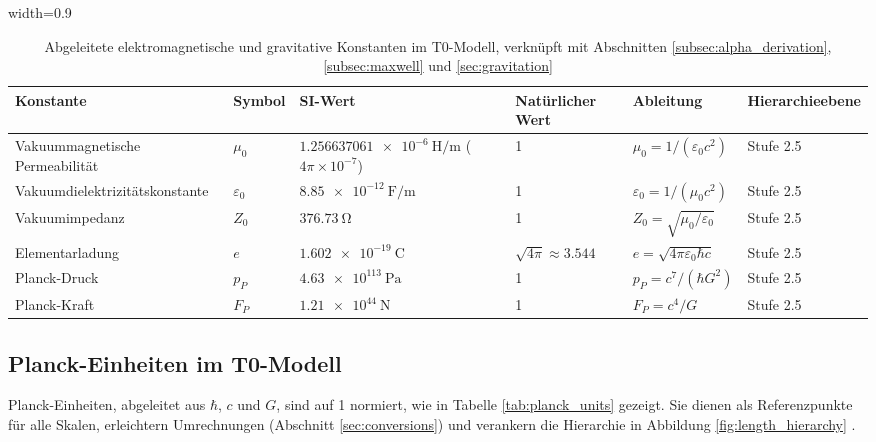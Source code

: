 \documentclass[12pt,a4paper]{article}
\newcommand{\tablescale}{0.9}
\begin{document}
	\begin{table}[htbp]
		\centering
		\begin{adjustbox}{width=\tablescale\textwidth}
			\begin{tabular}{llllll}
				\toprule
				\textbf{Konstante} & \textbf{Symbol} & \textbf{SI-Wert} & \textbf{Natürlicher Wert} & \textbf{Ableitung} & \textbf{Hierarchieebene} \\
				\midrule
				Vakuummagnetische Permeabilität & \(\mu_0\) & \(\SI{1.256637061e-6}{\henry\per\meter}\) (\(4\pi \times 10^{-7}\)) & 1 & \(\mu_0 = 1/(\varepsilon_0 c^2)\) & Stufe 2.5 \\
				Vakuumdielektrizitätskonstante & \(\varepsilon_0\) & \(\SI{8.85e-12}{\farad\per\meter}\) & 1 & \(\varepsilon_0 = 1/(\mu_0 c^2)\) & Stufe 2.5 \\
				Vakuumimpedanz & \(Z_0\) & \(\SI{376.73}{\ohm}\) & 1 & \(Z_0 = \sqrt{\mu_0/\varepsilon_0}\) & Stufe 2.5 \\
				Elementarladung & \(e\) & \(\SI{1.602e-19}{\coulomb}\) & \(\sqrt{4\pi} \approx 3.544\) & \(e = \sqrt{4\pi \varepsilon_0 \hbar c}\) & Stufe 2.5 \\
				Planck-Druck & \(p_P\) & \(\SI{4.63e113}{\pascal}\) & 1 & \(p_P = c^7/(\hbar G^2)\) & Stufe 2.5 \\
				Planck-Kraft & \(F_P\) & \(\SI{1.21e44}{\newton}\) & 1 & \(F_P = c^4/G\) & Stufe 2.5 \\
				\bottomrule
			\end{tabular}
		\end{adjustbox}
		\caption{Abgeleitete elektromagnetische und gravitative Konstanten im T0-Modell, verknüpft mit Abschnitten \ref{subsec:alpha_derivation}, \ref{subsec:maxwell} und \ref{sec:gravitation}}
		\label{tab:em_const}
	\end{table}
	
	\subsection{Planck-Einheiten im T0-Modell}
	\label{subsec:planck_units}
	
	Planck-Einheiten, abgeleitet aus \(\hbar\), \(c\) und \(G\), sind auf 1 normiert, wie in Tabelle \ref{tab:planck_units} gezeigt. Sie dienen als Referenzpunkte für alle Skalen, erleichtern Umrechnungen (Abschnitt \ref{sec:conversions}) und verankern die Hierarchie in Abbildung \ref{fig:length_hierarchy} \cite{pascher_planck_2025}.
	
\end{document}
